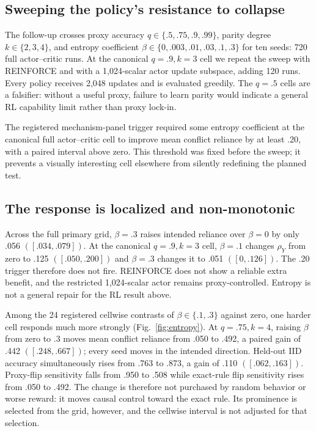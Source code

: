 \documentclass[11pt,a4paper]{article}
\newcommand{\rhoY}{\rho_Y}
\newcommand{\fig}[1]{Fig.~\ref{#1}}
\begin{document}
\subsection*{Sweeping the policy's resistance to collapse}

The follow-up crosses proxy accuracy $q\in\{.5,.75,.9,.99\}$, parity degree $k\in\{2,3,4\}$, and entropy coefficient $\beta\in\{0,.003,.01,.03,.1,.3\}$ for ten seeds: 720 full actor--critic runs. At the canonical $q=.9,k=3$ cell we repeat the sweep with REINFORCE and with a 1,024-scalar actor update subspace, adding 120 runs. Every policy receives 2,048 updates and is evaluated greedily. The $q=.5$ cells are a falsifier: without a useful proxy, failure to learn parity would indicate a general RL capability limit rather than proxy lock-in.

The registered mechanism-panel trigger required some entropy coefficient at the canonical full actor--critic cell to improve mean conflict reliance by at least .20, with a paired interval above zero. This threshold was fixed before the sweep; it prevents a visually interesting cell elsewhere from silently redefining the planned test.

\subsection*{The response is localized and non-monotonic}

Across the full primary grid, $\beta=.3$ raises intended reliance over $\beta=0$ by only .056 $([.034,.079])$. At the canonical $q=.9,k=3$ cell, $\beta=.1$ changes $\rhoY$ from zero to .125 $([.050,.200])$ and $\beta=.3$ changes it to .051 $([0,.126])$. The .20 trigger therefore does not fire. REINFORCE does not show a reliable extra benefit, and the restricted 1,024-scalar actor remains proxy-controlled. Entropy is not a general repair for the RL result above.

Among the 24 registered cellwise contrasts of $\beta\in\{.1,.3\}$ against zero, one harder cell responds much more strongly (\fig{fig:entropy}). At $q=.75,k=4$, raising $\beta$ from zero to .3 moves mean conflict reliance from .050 to .492, a paired gain of .442 $([.248,.667])$; every seed moves in the intended direction. Held-out IID accuracy simultaneously rises from .763 to .873, a gain of .110 $([.062,.163])$. Proxy-flip sensitivity falls from .950 to .508 while exact-rule flip sensitivity rises from .050 to .492. The change is therefore not purchased by random behavior or worse reward: it moves causal control toward the exact rule. Its prominence is selected from the grid, however, and the cellwise interval is not adjusted for that selection.
\end{document}
